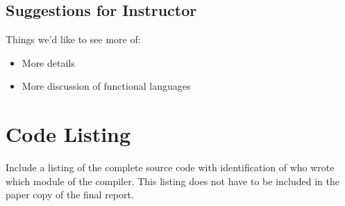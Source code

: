 \documentclass{book}
\begin{document}
\section{Suggestions for Instructor}

Things we'd like to see more of:

\begin{itemize}
\item More details  
\item More discussion of functional languages
\end{itemize}

\appendix

\chapter{Code Listing}

Include a listing of the complete source code with identification of who wrote
which module of the compiler. This listing does not have to be included in the
paper copy of the final report.

\nocite{*}


\end{document}
